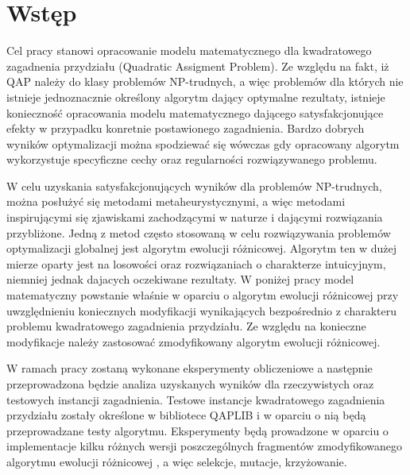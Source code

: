 \chapter{Wstęp}


Cel pracy stanowi opracowanie modelu matematycznego dla kwadratowego zagadnenia przydziału (Quadratic Assigment Problem). Ze względu na fakt, iż QAP należy do klasy problemów NP-trudnych, a więc problemów dla których nie istnieje jednoznacznie określony algorytm dający optymalne rezultaty, istnieje konieczność opracowania modelu matematycznego dającego satysfakcjonujące efekty w przypadku konretnie postawionego zagadnienia. Bardzo dobrych wyników optymalizacji można spodziewać się wówczas gdy opracowany algorytm wykorzystuje specyficzne cechy oraz regularności rozwiązywanego problemu. 

W celu uzyskania satysfakcjonujących wyników dla problemów NP-trudnych, można posłużyć się metodami metaheurystycznymi, a więc metodami inspirującymi się zjawiskami zachodzącymi w naturze i dającymi rozwiązania przybliżone. Jedną z metod często stosowaną w celu rozwiązywania problemów optymalizacji globalnej jest algorytm ewolucji różnicowej. Algorytm ten w dużej mierze oparty jest na losowości oraz rozwiązaniach o charakterze intuicyjnym, niemniej jednak dajacych oczekiwane rezultaty. W poniżej pracy model matematyczny powstanie właśnie w oparciu o algorytm ewolucji różnicowej przy uwzględnieniu koniecznych modyfikacji wynikających bezpośrednio z charakteru problemu kwadratowego zagadnienia przydziału. Ze względu na konieczne modyfikacje należy zastosować zmodyfikowany algorytm ewolucji różnicowej. 


 W ramach pracy zostaną wykonane eksperymenty obliczeniowe a następnie przeprowadzona będzie analiza uzyskanych wyników dla rzeczywistych oraz testowych instancji zagadnienia. Testowe instancje kwadratowego zagadnienia przydziału zostały określone w bibliotece QAPLIB i w oparciu o nią będą przeprowadzane testy algorytmu. Eksperymenty będą prowadzone w oparciu o implementacje kilku różnych wersji poszczególnych fragmentów zmodyfikowanego algorytmu ewolucji różnicowej , a więc selekcje, mutacje, krzyżowanie.